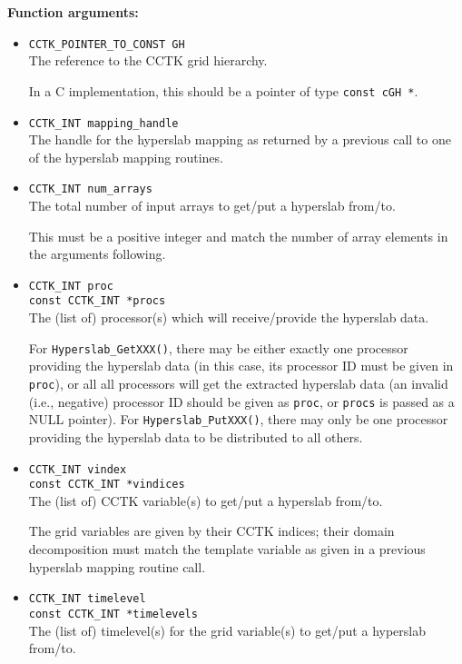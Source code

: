 \documentclass{article}
\begin{document}
{\bf Function arguments:}
\begin{itemize}
  \item{\tt CCTK\_POINTER\_TO\_CONST GH}\\
    The reference to the CCTK grid hierarchy.

    In a C implementation, this should be a pointer of type {\tt const cGH *}.

  \item{\tt CCTK\_INT mapping\_handle}\\
    The handle for the hyperslab mapping as returned by a previous call to
    one of the hyperslab mapping routines.

  \item{\tt CCTK\_INT num\_arrays}\\
    The total number of input arrays to get/put a hyperslab from/to.

    This must be a positive integer and match the number of array elements
    in the arguments following.

  \item{\tt CCTK\_INT proc\\
    const CCTK\_INT *procs}\\
    The (list of) processor(s) which will receive/provide the hyperslab data.

    For {\tt Hyperslab\_GetXXX()}, there may be either exactly one processor
    providing the hyperslab data (in this case, its processor ID must be given
    in {\tt proc}), or all all processors will get the extracted hyperslab data
    (an invalid (i.e., negative) processor ID should be given as {\tt proc}, or
    {\tt procs} is passed as a NULL pointer).
    For {\tt Hyperslab\_PutXXX()}, there may only be one processor providing
    the hyperslab data to be distributed to all others.

  \item{\tt CCTK\_INT vindex\\
    const CCTK\_INT *vindices}\\
    The (list of) CCTK variable(s) to get/put a hyperslab from/to.

    The grid variables are given by their CCTK indices; their domain
    decomposition must match the template variable as given in a previous
    hyperslab mapping routine call.

  \item{\tt CCTK\_INT timelevel\\
    const CCTK\_INT *timelevels}\\
    The (list of) timelevel(s) for the grid variable(s) to get/put a hyperslab from/to.


\end{itemize}
\end{document}
